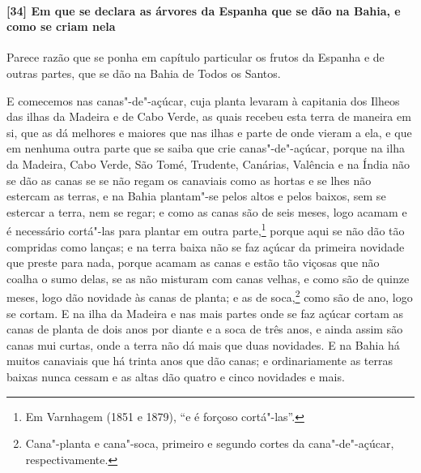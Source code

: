\begin{linenumbers}
\paragraph{[34] Em que se declara as árvores da Espanha que se dão na Bahia, e como se criam
nela}\quad
Parece razão que se ponha em capítulo particular os frutos da Espanha e de outras partes,
que se dão na Bahia de Todos os Santos.

E comecemos nas canas"-de"-açúcar, cuja planta levaram à capitania dos Ilheos das ilhas da
Madeira e de Cabo Verde, as quais recebeu esta terra de maneira em si, que as dá melhores
e maiores que nas ilhas e parte de onde vieram a ela, e que em nenhuma outra parte que se
saiba que crie canas"-de"-açúcar, porque na ilha da Madeira, Cabo Verde, São Tomé, Trudente,
Canárias, Valência e na Índia não se dão as canas se se não regam os canaviais como as
hortas e se lhes não estercam as terras, e na Bahia plantam"-se pelos altos e pelos baixos,
sem se estercar a terra, nem se regar; e como as canas são de seis meses, logo acamam e é
necessário cortá"-las para plantar em outra parte,\footnote{ Em Varnhagem (1851 e 1879),
``e é forçoso cortá"-las''.} porque aqui se não dão tão compridas como lanças; e na terra
baixa não se faz açúcar da primeira novidade que preste para nada, porque acamam as canas
e estão tão viçosas que não coalha o sumo delas, se as não misturam com canas velhas, e
como são de quinze meses, logo dão novidade às canas de planta; e as de soca,\footnote{
Cana"-planta e cana"-soca, primeiro e segundo cortes da cana"-de"-açúcar, respectivamente.}
como são de ano, logo se cortam. E na ilha da Madeira e nas mais partes onde se faz açúcar
cortam as canas de planta de dois anos por diante e a soca de três anos, e ainda assim são
canas mui curtas, onde a terra não dá mais que duas novidades. E na Bahia há muitos
canaviais que há trinta anos que dão canas; e ordinariamente as terras baixas nunca cessam
e as altas dão quatro e cinco novidades e mais.


\end{linenumbers}
